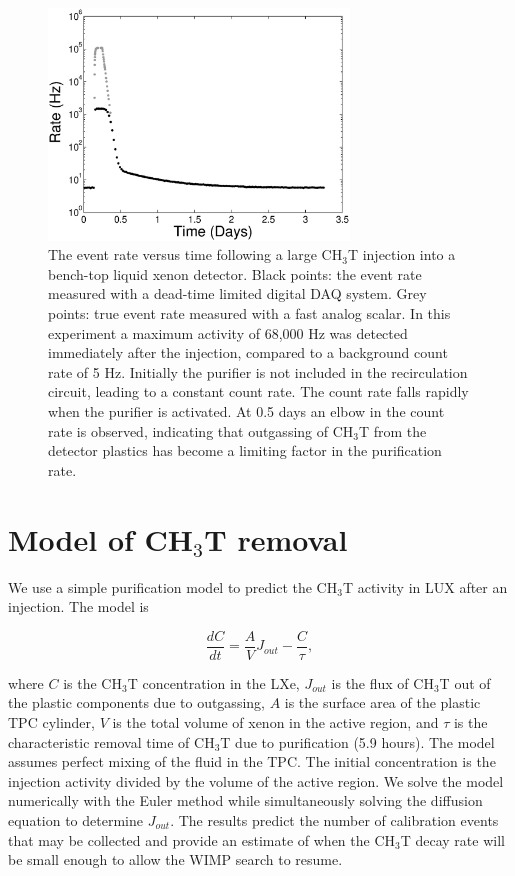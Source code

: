 \begin{figure}[h!]
\includegraphics[width=80mm]{fig/TimeHisto_Analog2.eps}
\caption{The event rate versus time following a large CH$_3$T injection into a bench-top liquid xenon detector. Black points: the event rate measured with a dead-time limited digital DAQ system. Grey points: true event rate measured with a fast analog scalar. In this experiment a maximum activity of 68,000 Hz was detected immediately after the injection, compared to a background count rate of 5 Hz. Initially the purifier is not included in the recirculation circuit, leading to a constant count rate. The count rate falls rapidly when the purifier is activated. At 0.5 days an elbow in the count rate is observed, indicating that outgassing of CH$_3$T from the detector plastics has become a limiting factor in the purification rate. }
\label{fig:Density}
\end{figure}


\section{Model of CH$_3$T removal}
\label{sec:appendix2}

We use a simple purification model to predict the CH$_3$T activity in LUX after an injection. The model is 

\begin{equation}
\frac{dC}{dt} = \frac{A}{V}J_{out} -\frac{C}{\tau},
\end{equation}

\noindent where  $C$ is the CH$_3$T concentration in the LXe,  $J_{out}$ is the flux of CH$_3$T out of the plastic components due to outgassing,  $A$ is the surface area of the plastic TPC cylinder, $V$ is the total volume of xenon in the active region, and $\tau$ is the characteristic removal time of CH$_3$T due to purification (5.9 hours). The model assumes perfect mixing of the fluid in the TPC. The initial concentration is the injection activity divided by the volume of the active region. We solve the model numerically with the Euler method while simultaneously solving the diffusion equation to determine $J_{out}$. The results predict the number of calibration events that may be collected and provide an estimate of when the CH$_3$T  decay rate will be small enough to allow the WIMP search to resume.

